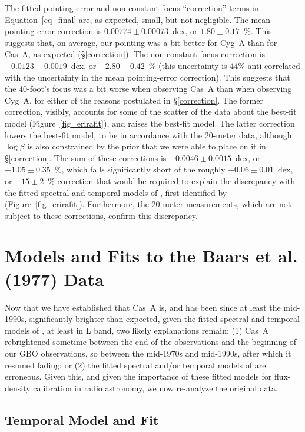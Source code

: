 \documentclass[fleqn,usenatbib]{mnras}
\begin{document}
The fitted pointing-error and non-constant focus ``correction'' terms in Equation~\ref{eq_final} are, as expected, small, but not negligible.  The mean pointing-error correction is $0.00774 \pm 0.00073$~dex, or $1.80 \pm 0.17$~\%.  This suggests that, on average, our pointing was a bit better for Cyg~A than for Cas~A, as expected (\S\ref{correction}).  The non-constant focus correction is $-0.0123 \pm 0.0019$~dex, or $-2.80 \pm 0.42$~\% (this uncertainty is 44\% anti-correlated with the uncertainty in the mean pointing-error correction).  This suggests that the 40-foot's focus was a bit worse when observing Cas~A than when observing Cyg~A, for either of the reasons postulated in \S\ref{correction}.  The former correction, visibly, accounts for some of the scatter of the data about the best-fit model (Figure~\ref{fig_erirafit}), and raises the best-fit model.  The latter correction lowers the best-fit model, to be in accordance with the 20-meter data, although $\log\beta$ is also constrained by the prior that we were able to place on it in \S\ref{correction}.  The sum of these corrections is $-0.0046 \pm 0.0015$~dex, or $-1.05 \pm 0.35$~\%, which falls significantly short of the roughly $-0.06 \pm 0.01$~dex, or $-15 \pm 2$~\% correction that would be required to explain the discrepancy with the fitted spectral and temporal models of \citet{b77}, first identified by \citet{r00} (Figure~\ref{fig_erirafit}).  Furthermore, the 20-meter measurements, which are not subject to these corrections, confirm this discrepancy.  

\section{Models and Fits to the Baars et al.\@ (1977) Data}\label{baars}

Now that we have established that Cas~A is, and has been since at least the mid-1990s, significantly brighter than expected, given the fitted spectral and temporal models of \citet{b77}, at least in L band, two likely explanations remain:  (1) Cas~A rebrightened sometime between the end of the \citet{b77} observations and the beginning of our GBO observations, so between the mid-1970s and mid-1990s, after which it resumed fading; or (2) the fitted spectral and/or temporal models of \citet{b77} are erroneous.  Given this, and given the importance of these fitted models for flux-density calibration in radio astronomy, we now re-analyze the original \citet{b77} data.  

\subsection{Temporal Model and Fit} \label{btemp}
\end{document}
